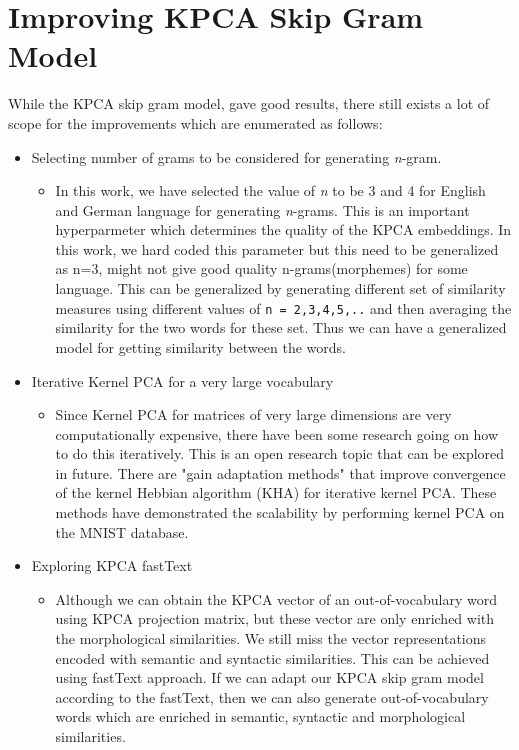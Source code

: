 \section{Improving KPCA Skip Gram Model}
While the KPCA skip gram model, gave good results, there still exists a lot of scope for the improvements which are enumerated as follows:
\begin{itemize}
	\item Selecting number of grams to be considered for generating \textit{n}-gram.
	\begin{itemize}
		\item In this work, we have selected the value of \textit{n} to be 3 and 4 for English and German language for generating \textit{n}-grams. This is an important hyperparmeter which determines the quality of the KPCA embeddings. In this work, we hard coded this parameter but this need to be generalized as n=3, might not give good quality n-grams(morphemes) for some language. This can be generalized by generating different set of similarity measures using different values of \texttt{n = 2,3,4,5,..} and then averaging the similarity for the two words for these set. Thus we can have a generalized model for getting similarity between the words.  
	\end{itemize}
	\item Iterative Kernel PCA for a very large vocabulary
	\begin{itemize}
		\item Since Kernel PCA for matrices of very large dimensions are very computationally expensive, there have been some research going on how to do this iteratively. This is an open research topic that can be explored in future. There are "gain adaptation methods" that improve convergence of the kernel Hebbian algorithm (KHA) for iterative kernel PCA. These methods have demonstrated the scalability by performing kernel PCA on the MNIST database.
	\end{itemize} 
	\item Exploring KPCA fastText
		\begin{itemize}
		\item Although we can obtain the KPCA vector of an out-of-vocabulary word using KPCA projection matrix, but these vector are only enriched with the morphological similarities. We still miss the vector representations encoded with semantic and syntactic similarities. This can be achieved using fastText approach. If we can adapt our KPCA skip gram model according to the fastText, then we can also generate out-of-vocabulary words which are enriched in semantic, syntactic and morphological similarities.  
	\end{itemize} 
\end{itemize}
